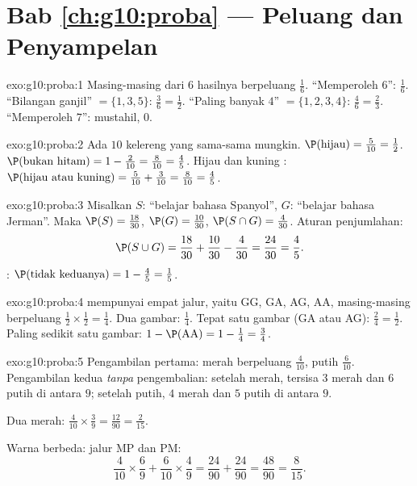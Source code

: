 \section*{Bab \ref{ch:g10:proba} --- Peluang dan Penyampelan}

\begin{solution}{exo:g10:proba:1}
Masing-masing dari $6$ hasilnya berpeluang $\frac16$.
``Memperoleh $6$'': $\frac16$.
``Bilangan ganjil'' $= \{1, 3, 5\}$: $\frac36 = \frac12$.
``Paling banyak $4$'' $= \{1,2,3,4\}$: $\frac46 = \frac23$.
``Memperoleh $7$'':  mustahil,  $0$.
\end{solution}

\begin{solution}{exo:g10:proba:2}
Ada $10$ kelereng yang sama-sama mungkin.
$\P(\text{hijau}) = \frac{5}{10} = \frac12$.
$\P(\text{bukan hitam}) = 1 - \frac{2}{10} = \frac{8}{10} = \frac45$.
Hijau dan kuning :
$\P(\text{hijau atau kuning}) = \frac{5}{10} + \frac{3}{10} = \frac{8}{10}
= \frac45$.
\end{solution}

\begin{solution}{exo:g10:proba:3}
Misalkan $S$: ``belajar bahasa Spanyol'', $G$: ``belajar bahasa Jerman''. Maka
$\P(S) = \frac{18}{30}$, $\P(G) = \frac{10}{30}$,
$\P(S \cap G) = \frac{4}{30}$. Aturan penjumlahan:
\[
\P(S \cup G) = \frac{18}{30} + \frac{10}{30} - \frac{4}{30}
= \frac{24}{30} = \frac45 .
\]
: $\P(\text{tidak keduanya}) = 1 - \frac45 = \frac15$.
\end{solution}

\begin{solution}{exo:g10:proba:4}
 mempunyai empat jalur, yaitu GG, GA, AG, AA, masing-masing berpeluang
$\frac12 \times \frac12 = \frac14$.
Dua gambar: $\frac14$. Tepat satu gambar (GA atau AG): $\frac24 = \frac12$.
Paling sedikit satu gambar: $1 - \P(\text{AA}) = 1 - \frac14 = \frac34$.
\end{solution}

\begin{solution}{exo:g10:proba:5}
Pengambilan pertama: merah berpeluang $\frac{4}{10}$, putih $\frac{6}{10}$.
Pengambilan kedua \emph{tanpa} pengembalian: setelah merah, tersisa $3$ merah
dan $6$ putih di antara $9$; setelah putih, $4$ merah dan $5$ putih di antara $9$.

Dua merah: $\frac{4}{10} \times \frac39 = \frac{12}{90} = \frac{2}{15}$.

Warna berbeda: jalur MP dan PM:
\[
\frac{4}{10} \times \frac69 + \frac{6}{10} \times \frac49
= \frac{24}{90} + \frac{24}{90} = \frac{48}{90} = \frac{8}{15}.
\]
\end{solution}

